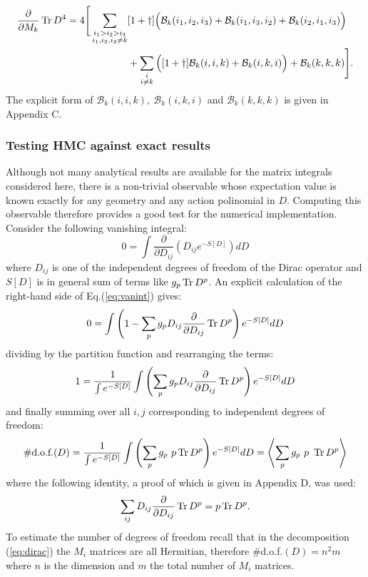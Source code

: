 \begin{align} 
\frac{\partial}{\partial M_k} \operatorname{Tr} D^4 = 4 \Bigg[ \sum_{\substack{i_1 > i_2 > i_3 \\ i_1,i_2,i_3 \neq k}} &[1+\dagger] \Big( \mathcal{B}_k(i_1, i_2, i_3) + \mathcal{B}_k(i_1, i_3, i_2) + \mathcal{B}_k(i_2, i_1, i_3) \Big) \notag \\
&+ \sum_{\substack{i \\ i \neq k}} \Big( [1+\dagger] \mathcal{B}_k(i, i, k) + \mathcal{B}_k(i, k, i) \Big) + \mathcal{B}_k(k,k,k) \Bigg].
\end{align}
The explicit form of $\mathcal{B}_k(i,i,k), \ \mathcal{B}_k(i,k,i)$ and $\mathcal{B}_k(k,k,k)$ is given in Appendix C.

\subsubsection{Testing HMC against exact results}
Although not many analytical results are available for the matrix integrals considered here, there is a non-trivial observable whose expectation value is known exactly for any geometry and any action polinomial in $D$. Computing this observable therefore provides a good test for the numerical implementation.\newline
Consider the following vanishing integral:
\begin{equation} \label{eq:vanint}
0 = \int \frac{\partial}{\partial D_{ij}} \left( D_{ij} e^{-S[D]} \right) d D
\end{equation}
where $D_{ij}$ is one of the independent degrees of freedom of the Dirac operator and $S[D]$ is in general sum of terms like $g_p \operatorname{Tr} D^p$.\newline
An explicit calculation of the right-hand side of Eq.(\ref{eq:vanint}) gives:
\begin{equation}
0 = \int \left( 1 - \sum_p g_p D_{ij} \frac{\partial}{\partial D_{ij}} \operatorname{Tr} D^p \right) e^{-S[D]}d D
\end{equation}
dividing by the partition function and rearranging the terms:
\begin{equation}
1 =\frac{1}{\int e^{-S[D]}} \int \left( \sum_p g_p D_{ij} \frac{\partial}{\partial D_{ij}} \operatorname{Tr} D^p \right) e^{-S[D]}d D
\end{equation}
and finally summing over all $i, j$ corresponding to independent degrees of freedom:
\begin{equation}
\#\text{d.o.f.}(D) = \frac{1}{\int e^{-S[D]}} \int \left( \sum_p g_p \ p \operatorname{Tr} D^p \right) e^{-S[D]} d D = \left\langle \sum_p g_p \ p \  \operatorname{Tr} D^p \right\rangle
\end{equation}
where the following identity, a proof of which is given in Appendix D, was used:
\begin{equation}
\sum_{ij} D_{ij} \frac{\partial}{\partial D_{ij}} \operatorname{Tr} D^p = p \operatorname{Tr} D^p.
\end{equation}
To estimate the number of degrees of freedom recall that in the decomposition (\ref{eq:dirac}) the $M_i$ matrices are all Hermitian, therefore {\#}d.o.f.$(D) = n^2m$ where $n$ is the dimension and $m$ the total number of $M_i$ matrices.


